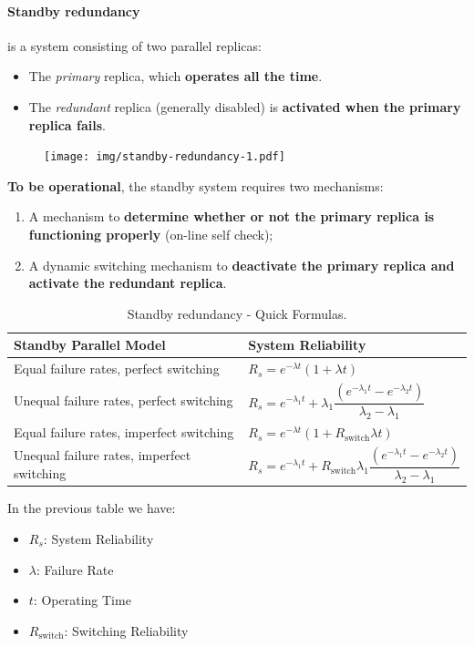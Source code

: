 \newpage

\paragraph{Standby redundancy}

 is a system consisting of two parallel replicas:
\begin{itemize}
	\item The \emph{primary} replica, which \textbf{operates all the time}.
	\item The \emph{redundant} replica (generally disabled) is \textbf{activated when the primary replica fails}.
\end{itemize}
\begin{figure}[!htp]
	\centering
	\texttt{[image: img/standby-redundancy-1.pdf]}
\end{figure}

\noindent
\textbf{To be operational}, the standby system requires two mechanisms:
\begin{enumerate}
	\item A mechanism to \textbf{determine whether or not the primary replica is functioning properly} (on-line self check);
	\item A dynamic switching mechanism to \textbf{deactivate the primary replica and activate the redundant replica}.
\end{enumerate}

\begin{table}[!htp]
	\centering
	\begin{tabular}{@{} p{13em} | p{18em} @{}}
		\toprule
		\textbf{Standby Parallel Model} & \textbf{System Reliability} \\
		\midrule
		Equal failure rates, perfect switching & $R_{s} = e^{-\lambda t}\left(1 + \lambda t\right)$ \\
		Unequal failure rates, perfect switching & $R_{s} = e^{-\lambda_{1} t} + \lambda_{1} \dfrac{\left(e^{-\lambda_{1} t} - e^{-\lambda_{2} t}\right)}{\lambda_{2}-\lambda_{1}}$ \\
		Equal failure rates, imperfect switching & $R_{s} = e^{-\lambda t} \left(1 + R_{\text{switch}} \lambda t\right)$ \\
		Unequal failure rates, imperfect switching & $R_{s} = e^{-\lambda_{1} t} + R_{\text{switch}}\lambda_{1} \dfrac{\left(e^{-\lambda_{1} t} - e^{-\lambda_{2} t}\right)}{\lambda_{2} - \lambda_{1}}$ \\
		\bottomrule
	\end{tabular}
	\caption{Standby redundancy - Quick Formulas.}
\end{table}

\noindent
In the previous table we have:
\begin{itemize}
	\item $R_{s}$: System Reliability
	\item $\lambda$: Failure Rate
	\item $t$: Operating Time
	\item $R_{\text{switch}}$: Switching Reliability
\end{itemize}